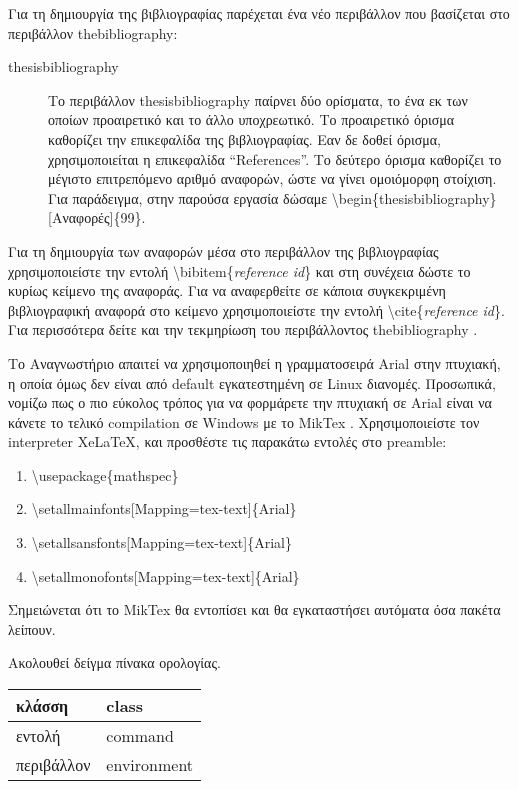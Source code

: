 \documentclass{dithesis}
\begin{document}
Για τη δημιουργία της βιβλιογραφίας παρέχεται ένα νέο περιβάλλον που
βασίζεται στο περιβάλλον thebibliography:
\begin{description}
\item[thesisbibliography]
  Το περιβάλλον thesisbibliography παίρνει δύο ορίσματα, το ένα εκ των οποίων
  προαιρετικό και το άλλο υποχρεωτικό.
  Το προαιρετικό όρισμα καθορίζει την επικεφαλίδα της βιβλιογραφίας.
  Εαν δε δοθεί όρισμα, χρησιμοποιείται η επικεφαλίδα ``References''.
  Το δεύτερο όρισμα καθορίζει το μέγιστο επιτρεπόμενο αριθμό αναφορών, ώστε
  να γίνει ομοιόμορφη στοίχιση.
  Για παράδειγμα, στην παρούσα εργασία δώσαμε
  \textbackslash{begin}\{thesisbibliography\}{[Αναφορές]}\{99\}.
\end{description}

Για τη δημιουργία των αναφορών μέσα στο περιβάλλον της βιβλιογραφίας 
χρησιμοποιείστε την εντολή \textbackslash{bibitem}\{\textit{reference id}\} και
στη συνέχεια δώστε το κυρίως κείμενο της αναφοράς.
Για να αναφερθείτε σε κάποια συγκεκριμένη βιβλιογραφική αναφορά στο κείμενο
χρησιμοποιείστε την εντολή \textbackslash{cite}\{\textit{reference id}\}.
Για περισσότερα δείτε και την τεκμηρίωση του περιβάλλοντος thebibliography
\cite{Bibliography}.

Το Αναγνωστήριο απαιτεί να χρησιμοποιηθεί η γραμματοσειρά Arial στην πτυχιακή,
η οποία όμως δεν είναι από default εγκατεστημένη σε Linux διανομές.
Προσωπικά, νομίζω πως ο πιο εύκολος τρόπος για να φορμάρετε την πτυχιακή σε
Arial είναι να κάνετε το τελικό compilation σε Windows με το MikTex 
\cite{Miktex}.
Χρησιμοποιείστε τον interpreter XeLaTeX, και προσθέστε τις παρακάτω
εντολές στο preamble:
\begin{enumerate}
\item
  \textbackslash{usepackage}\{mathspec\}
\item
  \textbackslash{setallmainfonts}{[Mapping=tex-text]}\{Arial\}
\item
  \textbackslash{setallsansfonts}{[Mapping=tex-text]}\{Arial\}
\item
  \textbackslash{setallmonofonts}{[Mapping=tex-text]}\{Arial\}
\end{enumerate}

Σημειώνεται ότι το MikTex θα εντοπίσει και θα εγκαταστήσει αυτόματα όσα πακέτα 
λείπουν.

\begin{thesisterminology}
Ακολουθεί δείγμα πίνακα ορολογίας.

\begin{tabularx}{\textwidth}{|X|X|}
  \hline
  κλάσση     & class \\
  \hline
  εντολή     & command \\
  \hline
  περιβάλλον & environment \\
  \hline
\end{tabularx}

\end{thesisterminology}
\end{document}

